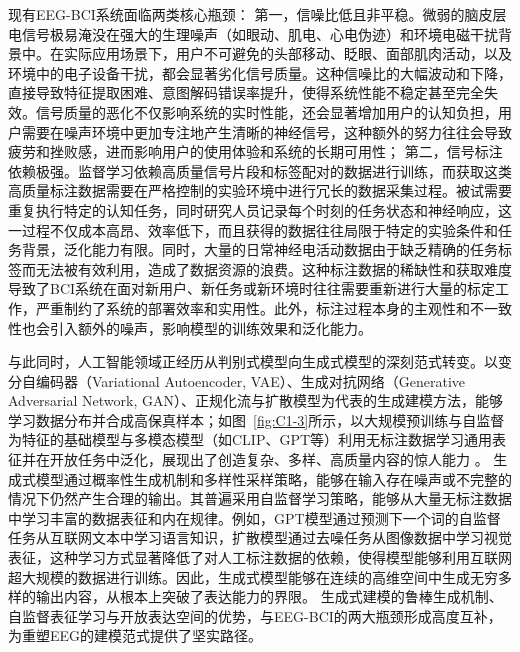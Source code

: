 现有EEG-BCI系统面临两类核心瓶颈：
第一，信噪比低且非平稳。微弱的脑皮层电信号极易淹没在强大的生理噪声（如眼动、肌电、心电伪迹）和环境电磁干扰背景中\cite{goncharova2003emg}。在实际应用场景下，用户不可避免的头部移动、眨眼、面部肌肉活动，以及环境中的电子设备干扰，都会显著劣化信号质量。这种信噪比的大幅波动和下降，直接导致特征提取困难、意图解码错误率提升，使得系统性能不稳定甚至完全失效。信号质量的恶化不仅影响系统的实时性能，还会显著增加用户的认知负担，用户需要在噪声环境中更加专注地产生清晰的神经信号，这种额外的努力往往会导致疲劳和挫败感，进而影响用户的使用体验和系统的长期可用性；
第二，信号标注依赖极强。监督学习依赖高质量信号片段和标签配对的数据进行训练，而获取这类高质量标注数据需要在严格控制的实验环境中进行冗长的数据采集过程\cite{lotte2018review}。被试需要重复执行特定的认知任务，同时研究人员记录每个时刻的任务状态和神经响应，这一过程不仅成本高昂、效率低下，而且获得的数据往往局限于特定的实验条件和任务背景，泛化能力有限。同时，大量的日常神经电活动数据由于缺乏精确的任务标签而无法被有效利用，造成了数据资源的浪费。这种标注数据的稀缺性和获取难度导致了BCI系统在面对新用户、新任务或新环境时往往需要重新进行大量的标定工作，严重制约了系统的部署效率和实用性。此外，标注过程本身的主观性和不一致性也会引入额外的噪声，影响模型的训练效果和泛化能力。


与此同时，人工智能领域正经历从判别式模型向生成式模型的深刻范式转变\cite{ooi2025potential}。以变分自编码器（Variational Autoencoder, VAE）\cite{kingma2014vae}、生成对抗网络（Generative Adversarial Network, GAN）\cite{goodfellow2014generative}、正规化流\cite{rezende2015variational}与扩散模型\cite{ho2020denoising,song2021score}为代表的生成建模方法，能够学习数据分布并合成高保真样本；如图~\ref{fig:C1-3}所示，以大规模预训练与自监督为特征的基础模型与多模态模型（如CLIP\cite{radford2021learning}、GPT\cite{brown2020language}等）利用无标注数据学习通用表征并在开放任务中泛化\cite{rombach2022high}，展现出了创造复杂、多样、高质量内容的惊人能力 \cite{chavez2023chat, ramesh2021zero, rombach2022high}。
生成式模型通过概率性生成机制和多样性采样策略，能够在输入存在噪声或不完整的情况下仍然产生合理的输出。其普遍采用自监督学习策略，能够从大量无标注数据中学习丰富的数据表征和内在规律。例如，GPT模型通过预测下一个词的自监督任务从互联网文本中学习语言知识，扩散模型通过去噪任务从图像数据中学习视觉表征，这种学习方式显著降低了对人工标注数据的依赖，使得模型能够利用互联网超大规模的数据进行训练。因此，生成式模型能够在连续的高维空间中生成无穷多样的输出内容，从根本上突破了表达能力的界限。
生成式建模的鲁棒生成机制、自监督表征学习与开放表达空间的优势，与EEG-BCI的两大瓶颈形成高度互补，为重塑EEG的建模范式提供了坚实路径。

